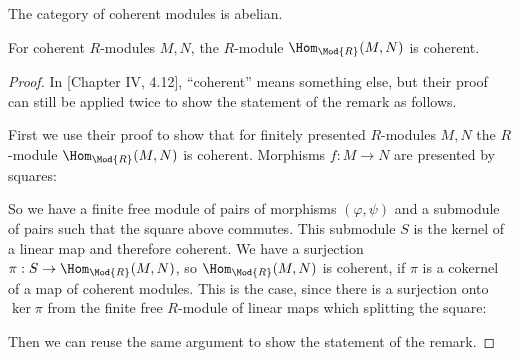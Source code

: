 \begin{theorem}
   The category of coherent modules is abelian.
\end{theorem}

\begin{remark}
  \label{hom-closure}
   For coherent $R$-modules $M,N$, the $R$-module $\Hom_{\Mod{R}}(M,N)$ is coherent.
\end{remark}

\begin{proof}
  In \cite{lombardi-quitte}[Chapter IV, 4.12], ``coherent'' means something else, but their proof can still be applied twice to show the statement of the remark as follows.
  
  First we use their proof to show that for finitely presented $R$-modules $M,N$ the $R$-module $\Hom_{\Mod{R}}(M,N)$ is coherent. Morphisms $f:M\to N$ are presented by squares:
  \begin{center}
\end{center}
  So we have a finite free module of pairs of morphisms $(\varphi,\psi)$ and a submodule of pairs such that the square above commutes.
  This submodule $S$ is the kernel of a linear map and therefore coherent.
  We have a surjection $\pi:S\to \Hom_{\Mod{R}}(M,N)$, so $\Hom_{\Mod{R}}(M,N)$ is coherent,
  if $\pi$ is a cokernel of a map of coherent modules.
  This is the case, since there is a surjection onto $\ker{\pi}$ from the finite free $R$-module of linear maps which splitting the square:
  \begin{center}
\end{center}
  Then we can reuse the same argument to show the statement of the remark.
\end{proof}

